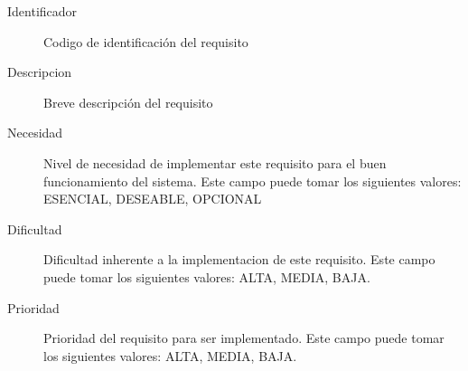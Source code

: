 \usepackage{framed}
\begin{framed}
\begin{description}
    \item[Identificador] Codigo de identificación del requisito
    \item[Descripcion] Breve descripción del requisito
    \item[Necesidad] Nivel de necesidad de implementar este requisito para el buen funcionamiento del sistema. Este campo puede tomar los siguientes valores: ESENCIAL, DESEABLE, OPCIONAL
    \item[Dificultad] Dificultad inherente a la implementacion de este requisito. Este campo puede tomar los siguientes valores: ALTA, MEDIA, BAJA.
    \item[Prioridad] Prioridad del requisito para ser implementado. Este campo puede tomar los siguientes valores: ALTA, MEDIA, BAJA.
\end{description}
\end{framed}
